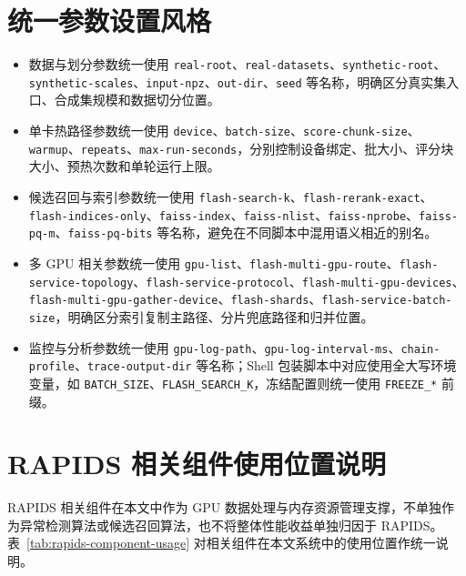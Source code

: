 \section{统一参数设置风格}

\begin{itemize}
  \item 数据与划分参数统一使用 \texttt{real-root}、\texttt{real-datasets}、\texttt{synthetic-root}、\texttt{synthetic-scales}、\texttt{input-npz}、\texttt{out-dir}、\texttt{seed} 等名称，明确区分真实集入口、合成集规模和数据切分位置。
  \item 单卡热路径参数统一使用 \texttt{device}、\texttt{batch-size}、\texttt{score-chunk-size}、\texttt{warmup}、\texttt{repeats}、\texttt{max-run-seconds}，分别控制设备绑定、批大小、评分块大小、预热次数和单轮运行上限。
  \item 候选召回与索引参数统一使用 \texttt{flash-search-k}、\texttt{flash-rerank-exact}、\texttt{flash-indices-only}、\texttt{faiss-index}、\texttt{faiss-nlist}、\texttt{faiss-nprobe}、\texttt{faiss-pq-m}、\texttt{faiss-pq-bits} 等名称，避免在不同脚本中混用语义相近的别名。
  \item 多 GPU 相关参数统一使用 \texttt{gpu-list}、\texttt{flash-multi-gpu-route}、\texttt{flash-service-topology}、\texttt{flash-service-protocol}、\texttt{flash-multi-gpu-devices}、\texttt{flash-multi-gpu-gather-device}、\texttt{flash-shards}、\texttt{flash-service-batch-size}，明确区分索引复制主路径、分片兜底路径和归并位置。
  \item 监控与分析参数统一使用 \texttt{gpu-log-path}、\texttt{gpu-log-interval-ms}、\texttt{chain-profile}、\texttt{trace-output-dir} 等名称；Shell 包装脚本中对应使用全大写环境变量，如 \texttt{BATCH\_SIZE}、\texttt{FLASH\_SEARCH\_K}，冻结配置则统一使用 \texttt{FREEZE\_*} 前缀。
\end{itemize}

\section{RAPIDS 相关组件使用位置说明}

RAPIDS 相关组件在本文中作为 GPU 数据处理与内存资源管理支撑，不单独作为异常检测算法或候选召回算法，也不将整体性能收益单独归因于 RAPIDS。表~\ref{tab:rapids-component-usage} 对相关组件在本文系统中的使用位置作统一说明。

